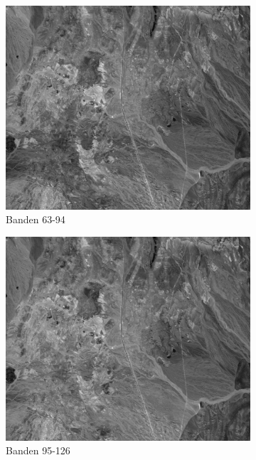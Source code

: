 \begin{figure}[H]
\begin{subfigure}{0.48\textwidth}
  \centering
  \includegraphics[width=0.95\linewidth]{images/cuprite_bands_63-95.png}
  \caption{Banden 63-94}
\end{subfigure}
\begin{subfigure}{0.48\textwidth}
  \centering
  \includegraphics[width=0.95\linewidth]{images/cuprite_bands_95-127.png}
  \caption{Banden 95-126}
\end{subfigure}
\\
\begin{subfigure}{0.48\textwidth}
  \centering

\end{subfigure}
\end{figure}
